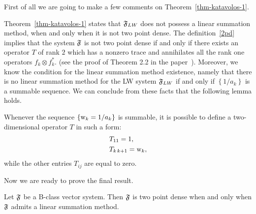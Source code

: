 \documentclass[12pt]{amsart}
\begin{document}
      First of all we are going to make a few comments on Theorem~\ref{thm-katavolos-1}.
      \begin{remark}
        Theorem~\ref{thm-katavolos-1} states that $\mathfrak{F}_{LW}$ does not possess a linear summation method,
          when and only when it is not two point dense.
        The definition~\ref{2pd} implies that the system $\mathfrak{F}$ is not two point dense
          if and only if there exists an operator $T$ of rank $2$
          which has a nonzero trace and annihilates all the rank one operators $f_k \otimes f^*_k$.
          (see the proof of Theorem 2.2 in the paper~\cite{katavolos}).
        Moreover, we know the condition for the linear summation method existence, namely that
          there is no linear summation method for the LW system $\mathfrak{F}_{LW}$ if and only if $\left\{1/a_k\right\}$
          is a summable sequence.
        We can conclude from these facts that the following lemma holds.
        \begin{lemma}
          \label{as-lemma}
          Whenever the sequence $\left\{\mathrm{w}_k = 1/a_k\right\}$ is summable,
            it is possible to define a two-dimensional operator $T$ in such a form:
          \begin{align*}
            &T_{11} = 1,\\
            &T_{k\, k+1} = \mathrm{w}_k,
          \end{align*}
          while the other entries $T_{ij}$ are equal to zero.
        \end{lemma}
      \end{remark}
      Now we are ready to prove the final result.
      \begin{theorem}
        \label{density-thm}
        Let $\mathfrak{F}$ be a B-class vector system.
        Then $\mathfrak{F}$ is two point dense when and only when $\mathfrak{F}$ admits a linear summation method.
      \end{theorem}
\end{document}
